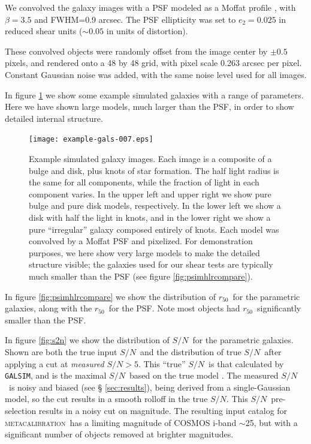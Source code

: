 \documentclass[iop]{emulateapj}
\newcommand{\snr}{$S/N$}
\newcommand{\hlr}{$r_{50}$}
\newcommand{\mcal}{\textsc{metacalibration}}
\newcommand{\galsim}{\texttt{GALSIM}}
\begin{document}
We convolved the galaxy images with a PSF modeled as a Moffat profile
\citep{Moffat1969}, with $\beta=3.5$ and FWHM=0.9 arcsec. The PSF ellipticity
was set to $e_2 = 0.025$ in reduced shear units ($\sim0.05$ in units of
distortion). 

These convolved objects were randomly offset from the image center by $\pm 0.5$
pixels, and rendered onto a 48 by 48 grid, with pixel scale 0.263 arcsec per
pixel. Constant Gaussian noise was added, with the same noise level used for
all images. 

In figure \ref{fig:parametricgals} we show some example simulated galaxies with
a range of parameters.  Here we have shown large models, much larger than the
PSF, in order to show detailed internal structure.

\begin{figure}[p]
    \centering
    \texttt{[image: example-gals-007.eps]}

    \caption{Example simulated galaxy images.  Each image is a composite of a
    bulge and disk, plus knots of star formation.  The half light radius is the
    same for all components, while the fraction of light in each component
    varies.  In the upper left and upper right we show pure bulge and pure disk
    models, respectively.  In the lower left we show a disk with half the light
    in knots, and in the lower right we show a pure ``irregular'' galaxy
    composed entirely of knots.  Each model was convolved by a Moffat PSF
	and pixelized.  For demonstration purposes, we here show very
    large models to make the detailed structure visible; the galaxies used for
    our shear tests are typically much smaller than the PSF (see figure
	\ref{fig:psimhlrcompare}). }

	\label{fig:parametricgals}

\end{figure}

In figure \ref{fig:psimhlrcompare} we show the distribution of \hlr\ for the
parametric galaxies, along with the \hlr\ for the PSF.  Note most objects had
\hlr\ significantly smaller than the PSF.

In figure \ref{fig:s2n} we show the distribution of \snr\ for the parametric
galaxies.   Shown are both the true input \snr\ and the distribution of true
\snr\ after applying a cut at {\it measured} \snr$ > 5$.  This ``true'' \snr\
is that calculated by \galsim, and is the maximal \snr\ based on the true model
\citep{Jarvis2016}.  The measured \snr\ is noisy and biased (see \S
\ref{sec:results}), being derived from a single-Gaussian model, so the cut
results in a smooth rolloff in the true \snr.  This \snr\ pre-selection results
in a noisy cut on magnitude.  The resulting input catalog for \mcal\ has a
limiting magnitude of COSMOS i-band $\sim$25, but with a significant number
of objects removed at brighter magnitudes.
\end{document}
